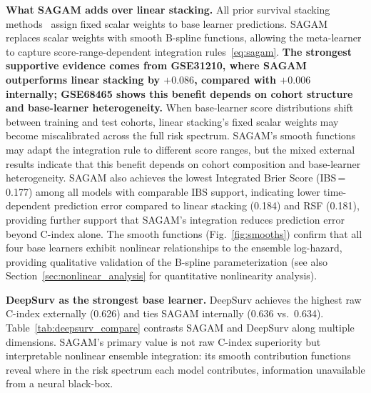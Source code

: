\documentclass[conference]{IEEEtran}
\begin{document}
\textbf{What SAGAM adds over linear stacking.}
All prior survival stacking
methods~\cite{lyu2026supersurv,golmakani2024joint,zhao2024bayesian,
vock2016adapting,huang2023twostage} assign fixed scalar weights to base
learner predictions.
SAGAM replaces scalar weights with smooth B-spline functions, allowing
the meta-learner to capture score-range-dependent integration
rules~\eqref{eq:sagam}.
\textbf{The strongest supportive evidence comes from GSE31210, where SAGAM
outperforms linear stacking by $+0.086$, compared with $+0.006$ internally;
GSE68465 shows this benefit depends on cohort structure and base-learner
heterogeneity.}
When base-learner score distributions shift between training and test cohorts,
linear stacking's fixed scalar weights may become miscalibrated across the
full risk spectrum.
SAGAM's smooth functions may adapt the integration rule to different score
ranges, but the mixed external results indicate that this benefit depends
on cohort composition and base-learner heterogeneity.
SAGAM also achieves the lowest Integrated Brier Score (IBS\,=\,0.177)
among all models with comparable IBS support, indicating lower
time-dependent prediction error compared to linear stacking (0.184)
and RSF (0.181), providing further support that SAGAM's integration
reduces prediction error beyond C-index alone.
The smooth functions (Fig.~\ref{fig:smooths}) confirm that all four base
learners exhibit nonlinear relationships to the ensemble log-hazard,
providing qualitative validation of the B-spline parameterization (see also
Section~\ref{sec:nonlinear_analysis} for quantitative nonlinearity analysis).

\textbf{DeepSurv as the strongest base learner.}
DeepSurv achieves the highest raw C-index externally (0.626) and ties SAGAM
internally (0.636 vs.\ 0.634).
Table~\ref{tab:deepsurv_compare} contrasts SAGAM and DeepSurv along
multiple dimensions.
SAGAM's primary value is not raw C-index superiority but interpretable
nonlinear ensemble integration: its smooth contribution functions reveal
where in the risk spectrum each model contributes, information unavailable
from a neural black-box.
\end{document}
